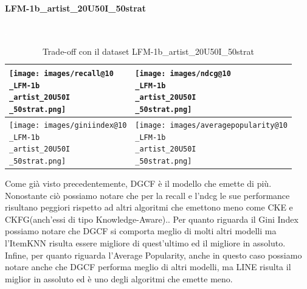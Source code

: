 \paragraph{LFM-1b\_artist\_20U50I\_50strat} \textcolor{white}{.} \\
\begin{table}[H]
    \centering
    \footnotesize
    \setlength\tabcolsep{0pt}
    \begin{tabularx}{\textwidth}{|X|X|}
        \hline
        \texttt{[image: images/recall@10\\\_LFM-1b\\\_artist\_20U50I\\\_50strat.png]} &
        \texttt{[image: images/ndcg@10\\\_LFM-1b\\\_artist\_20U50I\\\_50strat.png]} \\
        \hline
        \texttt{[image: images/giniindex@10\\\_LFM-1b\\\_artist\_20U50I\\\_50strat.png]} &
        \texttt{[image: images/averagepopularity@10\\\_LFM-1b\\\_artist\_20U50I\\\_50strat.png]} \\
        \hline
    \end{tabularx}
    \caption{Trade-off con il dataset LFM-1b\_artist\_20U50I\_50strat}
    \label{tab:emissions_info}
\end{table}


\noindent Come già visto precedentemente, DGCF è il modello che emette di più. Nonostante ciò possiamo notare che per la recall e l'ndcg le sue performance risultano peggiori rispetto ad altri algoritmi che emettono meno come CKE e CKFG(anch'essi di tipo Knowledge-Aware)..
Per quanto riguarda il Gini Index possiamo notare che DGCF si comporta meglio di molti altri modelli ma l'ItemKNN risulta essere migliore di quest'ultimo ed il migliore in assoluto.
Infine, per quanto riguarda l'Average Popularity, anche in questo caso possiamo notare anche che DGCF performa meglio di altri modelli, ma LINE risulta il miglior in assoluto ed è uno degli algoritmi che emette meno.

